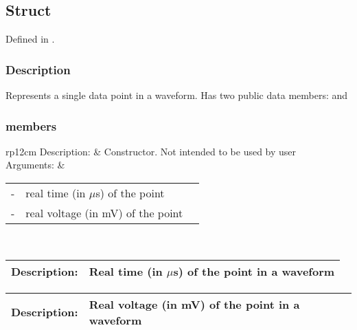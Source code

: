 \newpage

\subsection{Struct }
Defined in .

\subsubsection*{Description}

\hspace{\parindent}Represents a single data point in a waveform. Has two public data members:  and 

\subsubsection*{ members}

\hspace{\parindent}

\begin{tabularx}{\textwidth}{rp{12cm}}
    \toprule
    Description: & Constructor. Not intended to be used by user\\[5pt]
    Arguments: &
        \begin{tabular}[t]{@{\hspace{0em}}l@{}@{\hspace{1em}}l@{}l}
            \codet{double time} - & real time (in $\mu$s) of the point\\
            \codet{double voltage} - & real voltage (in mV) of the point\\
        \end{tabular}\\
    \bottomrule
\end{tabularx}

\vspace{0.5cm}

\begin{tabularx}{\textwidth}{rp{12cm}}
    \toprule
    Description: & Real time (in $\mu$s) of the point in a waveform\\[5pt]
    \bottomrule
\end{tabularx}

\vspace{0.5cm}

\begin{tabularx}{\textwidth}{rp{12cm}}
    \toprule
    Description: & Real voltage (in mV) of the point in a waveform\\[5pt]
    \bottomrule
\end{tabularx}

